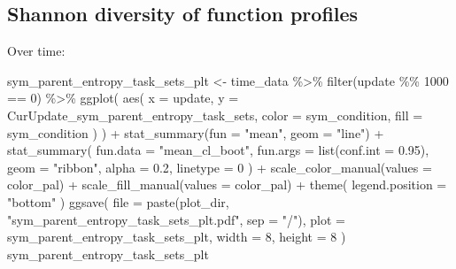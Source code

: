 \documentclass[
]{book}
\newenvironment{Shaded}{\begin{snugshade}}{\end{snugshade}}
\newcommand{\AttributeTok}[1]{\textcolor[rgb]{0.77,0.63,0.00}{#1}}
\newcommand{\DecValTok}[1]{\textcolor[rgb]{0.00,0.00,0.81}{#1}}
\newcommand{\FloatTok}[1]{\textcolor[rgb]{0.00,0.00,0.81}{#1}}
\newcommand{\FunctionTok}[1]{\textcolor[rgb]{0.00,0.00,0.00}{#1}}
\newcommand{\NormalTok}[1]{#1}
\newcommand{\OtherTok}[1]{\textcolor[rgb]{0.56,0.35,0.01}{#1}}
\newcommand{\SpecialCharTok}[1]{\textcolor[rgb]{0.00,0.00,0.00}{#1}}
\newcommand{\StringTok}[1]{\textcolor[rgb]{0.31,0.60,0.02}{#1}}
\begin{document}
\hypertarget{shannon-diversity-of-function-profiles-1}{%
\subsection{Shannon diversity of function profiles}\label{shannon-diversity-of-function-profiles-1}}

Over time:

\begin{Shaded}
\begin{Highlighting}[]
\NormalTok{sym\_parent\_entropy\_task\_sets\_plt }\OtherTok{\textless{}{-}}\NormalTok{ time\_data }\SpecialCharTok{\%\textgreater{}\%}
  \FunctionTok{filter}\NormalTok{(update }\SpecialCharTok{\%\%} \DecValTok{1000} \SpecialCharTok{==} \DecValTok{0}\NormalTok{) }\SpecialCharTok{\%\textgreater{}\%}
  \FunctionTok{ggplot}\NormalTok{(}
    \FunctionTok{aes}\NormalTok{(}
      \AttributeTok{x =}\NormalTok{ update,}
      \AttributeTok{y =}\NormalTok{ CurUpdate\_sym\_parent\_entropy\_task\_sets,}
      \AttributeTok{color =}\NormalTok{ sym\_condition,}
      \AttributeTok{fill =}\NormalTok{ sym\_condition}
\NormalTok{    )}
\NormalTok{  ) }\SpecialCharTok{+}
  \FunctionTok{stat\_summary}\NormalTok{(}\AttributeTok{fun =} \StringTok{"mean"}\NormalTok{, }\AttributeTok{geom =} \StringTok{"line"}\NormalTok{) }\SpecialCharTok{+}
  \FunctionTok{stat\_summary}\NormalTok{(}
    \AttributeTok{fun.data =} \StringTok{"mean\_cl\_boot"}\NormalTok{,}
    \AttributeTok{fun.args =} \FunctionTok{list}\NormalTok{(}\AttributeTok{conf.int =} \FloatTok{0.95}\NormalTok{),}
    \AttributeTok{geom =} \StringTok{"ribbon"}\NormalTok{,}
    \AttributeTok{alpha =} \FloatTok{0.2}\NormalTok{,}
    \AttributeTok{linetype =} \DecValTok{0}
\NormalTok{  ) }\SpecialCharTok{+}
  \FunctionTok{scale\_color\_manual}\NormalTok{(}\AttributeTok{values =}\NormalTok{ color\_pal) }\SpecialCharTok{+}
  \FunctionTok{scale\_fill\_manual}\NormalTok{(}\AttributeTok{values =}\NormalTok{ color\_pal) }\SpecialCharTok{+}
  \FunctionTok{theme}\NormalTok{(}
    \AttributeTok{legend.position =} \StringTok{"bottom"}
\NormalTok{  )}
\FunctionTok{ggsave}\NormalTok{(}
  \AttributeTok{file =} \FunctionTok{paste}\NormalTok{(plot\_dir, }\StringTok{"sym\_parent\_entropy\_task\_sets\_plt.pdf"}\NormalTok{, }\AttributeTok{sep =} \StringTok{"/"}\NormalTok{),}
  \AttributeTok{plot =}\NormalTok{ sym\_parent\_entropy\_task\_sets\_plt,}
  \AttributeTok{width =} \DecValTok{8}\NormalTok{,}
  \AttributeTok{height =} \DecValTok{8}
\NormalTok{)}
\NormalTok{sym\_parent\_entropy\_task\_sets\_plt}
\end{Highlighting}
\end{Shaded}
\end{document}
